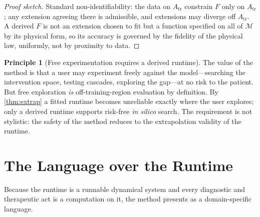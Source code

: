 \documentclass[11pt,a4paper]{article}
\theoremstyle{thmstyle}
\theoremstyle{definition}
\newtheorem{principle}[theorem]{Principle}
\theoremstyle{remark}
\newcommand{\Man}{\mathcal{M}}          %
\newcommand{\fld}{F}                    %
\begin{document}
\begin{proof}[Proof sketch]
Standard non-identifiability: the data on $A_{\mathrm{tr}}$ constrain
$\fld$ only on $A_{\mathrm{tr}}$; any extension agreeing there is
admissible, and extensions may diverge off $A_{\mathrm{tr}}$. A derived
$\fld$ is not an extension chosen to fit but a function specified on all of
$\Man$ by its physical form, so its accuracy is governed by the fidelity of
the physical law, uniformly, not by proximity to data.
\end{proof}

\begin{principle}[Free experimentation requires a derived runtime]
\label{prin:derived}
The value of the method is that a user may experiment freely against the
model---searching the intervention space, testing cascades, exploring the
gap---at no risk to the patient. But free exploration \emph{is}
off-training-region evaluation by definition. By \cref{thm:extrap} a fitted
runtime becomes unreliable exactly where the user explores; only a derived
runtime supports risk-free \emph{in silico} search. The requirement is not
stylistic: the safety of the method reduces to the extrapolation validity
of the runtime.
\end{principle}

\section{The Language over the Runtime}
\label{sec:dsl}

Because the runtime is a runnable dynamical system and every diagnostic and
therapeutic act is a computation on it, the method presents as a
domain-specific language.
\end{document}
